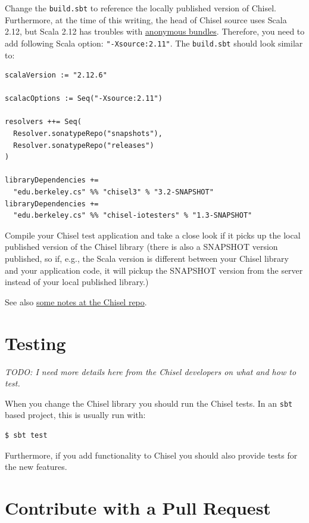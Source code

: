 \documentclass[%
    10pt, %
    headinclude, footexclude,
    openright, %
    notitlepage,
    cleardoubleempty,
    headsepline,
    pointlessnumbers,
    bibtotoc, idxtotoc,
    ]{scrbook}
\newcommand{\code}[1]{{\small{\texttt{#1}}}}
\newcommand{\todo}[1]{{\emph{TODO: #1}}}
\newcommand{\myref}[2]{\href{#1}{#2}}
\begin{document}
Change the \code{build.sbt} to reference the locally published version of Chisel.
Furthermore, at the time of this writing, the head of Chisel source uses Scala 2.12, but Scala
2.12 has troubles with
\myref{https://github.com/freechipsproject/chisel-template/issues/35}{anonymous bundles}.
Therefore, you need to add following Scala option: \code{"-Xsource:2.11"}.
The \code{build.sbt} should look similar to:

\begin{verbatim}
scalaVersion := "2.12.6"

scalacOptions := Seq("-Xsource:2.11")

resolvers ++= Seq(
  Resolver.sonatypeRepo("snapshots"),
  Resolver.sonatypeRepo("releases")
)

libraryDependencies +=
  "edu.berkeley.cs" %% "chisel3" % "3.2-SNAPSHOT"
libraryDependencies +=
  "edu.berkeley.cs" %% "chisel-iotesters" % "1.3-SNAPSHOT"
\end{verbatim}

Compile your Chisel test application and take a close look if it picks up the local published
version of the Chisel library (there is also a SNAPSHOT version published, so if, e.g.,
the Scala version is different between your Chisel library and your application code,
it will pickup the SNAPSHOT version from the server instead of your local published
library.)

See also \myref{https://github.com/freechipsproject/chisel3\#for-chisel-developers}{some notes
at the Chisel repo}.

\section{Testing}

\todo{I need more details here from the Chisel developers on what and how
to test.}

When you change the Chisel library you should run the Chisel tests.
In an \code{sbt} based project, this is usually run with:

\begin{verbatim}
$ sbt test
\end{verbatim}

Furthermore, if you add functionality to Chisel you should also provide tests for the
new features.

\section{Contribute with a Pull Request}
\end{document}
